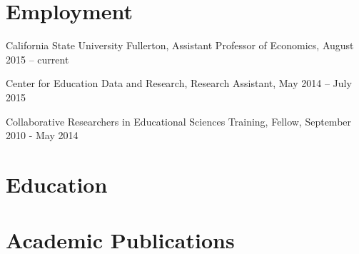 \documentclass[11pt,a4paper,serif]{moderncv}
\begin{document}
\makecvtitle
\section{Employment}  
  
California State University Fullerton, Assistant Professor of Economics, August 2015 -- current



Center for Education Data and Research, Research Assistant, May 2014 -- July 2015



Collaborative Researchers in Educational Sciences Training, Fellow, September 2010 - May 2014



\section{Education}  
  
 



\section{Academic Publications}  
  
\end{document}
